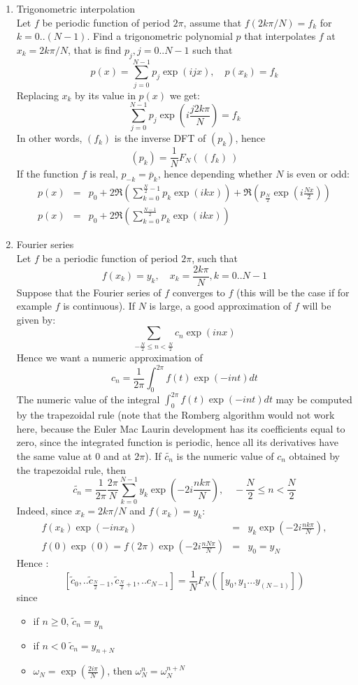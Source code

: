 \documentclass[a4paper,11pt]{book}
\begin{document}
\begin{enumerate}
\item Trigonometric interpolation\\
Let $f$ be periodic function of period $2\pi$, assume that $f(2k\pi/N)=f_k$ 
for $k=0..(N-1)$. Find a trigonometric polynomial $p$ that interpolates $f$ 
at $x_k=2k\pi/N$, that is find $p_j, j=0..N-1$ such that
\[  p(x)= \sum_{j=0}^{N-1} p_j \exp(ijx), \quad p(x_k)=f_k\]
Replacing $x_k$ by its value in $p(x)$ we get:
\[ \sum_{j=0}^{N-1} p_j \exp(i\frac{j2k\pi}{N}) = f_k\]
In other words, $(f_k)$ is the inverse DFT of $(p_k)$, hence
\[ (p_k)= \frac{1}{N} F_N( \ (f_k) \ ) \]
If the function $f$ is real, $p_{-k}=\overline p_k$, hence depending
whether $N$ is even or odd:
\begin{eqnarray*}
p(x)&=&p_0+
2 \Re(\sum_{k=0}^{\frac{N}{2}-1}p_k\exp(ikx))+\Re(p_{\frac{N}{2}} \exp(i\frac{Nx}{2})) \\
p(x)&=&p_0+ 2 \Re(\sum_{k=0}^{\frac{N-1}{2}}p_k\exp(ikx))
\end{eqnarray*}

\item  Fourier series\\
Let $f$ be a periodic function of period $2\pi$, such that
\[ f(x_k)=y_k, \quad x_k=\frac{2k\pi}{N}, k=0..N-1 \]
Suppose that the Fourier series of $f$ converges to $f$ (this will
be the case if for example $f$ is continuous). If $N$ is large,
a good approximation of $f$ will be given by:
\[ \sum_{-\frac{N}{2} \leq n<\frac{N}{2}} c_n \exp(inx) \]
Hence we want a numeric approximation of
\[ c_n=\frac{1}{2\pi} \int_0^{2\pi}f(t)\exp(-int)dt \]
The  numeric value of the integral $\int_0^{2\pi}f(t)\exp(-int)dt$ may be
computed by the trapezoidal rule
(note that the Romberg algorithm would not work here, 
because the Euler Mac Laurin development 
has its coefficients equal to zero, since the integrated function is 
periodic, hence all its derivatives have the same value at $0$ and at $2\pi$).
If $\tilde{c_n}$ is the numeric value of $c_n$ obtained by the
trapezoidal rule, then 
\[
\tilde{c_n}=\frac{1}{2\pi}\frac{2\pi}{N}\sum_{k=0}^{N-1}y_k\exp(-2i\frac{nk\pi}{N}),
\quad  -\frac{N}{2} \leq n<\frac{N}{2} \]
Indeed, since $x_k=2k\pi/N$ and  $f(x_k)=y_k$:
\begin{eqnarray*} 
f(x_k)\exp(-inx_k)&=&y_k\exp(-2i\frac{nk\pi}{N}), \\
f(0)\exp(0)=f(2\pi)\exp(-2i\frac{nN\pi}{N})&=&y_0=y_N 
\end{eqnarray*}
Hence :
\[
[\tilde{c}_0,..\tilde{c}_{\frac{N}{2}-1},\tilde{c}_{\frac{N}{2}+1},..c_{N-1}]=
\frac{1}{N}F_N([y_0,y_1...y_{(N-1)}]) \]
since
\begin{itemize}
\item if $n\geq0$, $\tilde{c}_n=y_n$ 
\item if $n<0$ $\tilde{c}_n=y_{n+N}$
\item $\omega_N=\exp(\frac{2i\pi}{N})$, 
then $\omega_N^n=\omega_N^{n+N}$ 
\end{itemize}


\end{enumerate}
\end{document}
